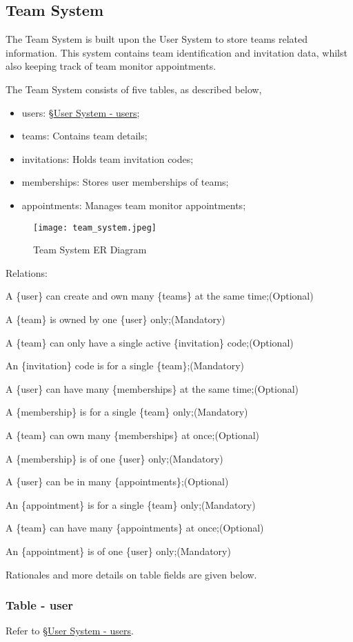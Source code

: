 \documentclass[12pt]{report}
\newcommand{\n}{\par}
\newcommand{\br}{\n\vspace{1 em}\n}
\begin{document}
\subsection{Team System} \label{data-layer.design.team-system}
The Team System is built upon the User System to store teams related information.
This system contains team identification and invitation data,
whilst also keeping track of team monitor appointments.
\br
The Team System consists of five tables, as described below,
\begin{itemize}
	\item users: \S \hyperref[data-layer.design.user-system.users]{User System - users};
	\item teams: Contains team details;
	\item invitations: Holds team invitation codes;
	\item memberships: Stores user memberships of teams;
	\item appointments: Manages team monitor appointments;
\end{itemize}
\br
\begin{figure}[h]
	\centering
	\texttt{[image: team\_system.jpeg]}
	\caption{Team System ER Diagram}
	\label{fig:team-system-er}
\end{figure}
\br
Relations:\n
A \{user\} can create and own many \{teams\} at the same time;\null\hfill (Optional)\n
A \{team\} is owned by one \{user\} only;\null\hfill (Mandatory)
\br
A \{team\} can only have a single active \{invitation\} code;\null\hfill (Optional)\n
An \{invitation\} code is for a single \{team\};\null\hfill (Mandatory)
\br
A \{user\} can have many \{memberships\} at the same time;\null\hfill (Optional)\n
A \{membership\} is for a single \{team\} only;\null\hfill (Mandatory)
\br
A \{team\} can own many \{memberships\} at once;\null\hfill (Optional)\n
A \{membership\} is of one \{user\} only;\null\hfill (Mandatory)
\br
A \{user\} can be in many \{appointments\};\null\hfill (Optional)\n
An \{appointment\} is for a single \{team\} only;\null\hfill (Mandatory)
\br
A \{team\} can have many \{appointments\} at once;\null\hfill (Optional)\n
An \{appointment\} is of one \{user\} only;\null\hfill (Mandatory)
\br
Rationales and more details on table fields are given below.

\subsubsection{Table - user} \label{data-layer.design.team-system.users}
Refer to \S \hyperref[data-layer.design.user-system.users]{User System - users}.
\end{document}
